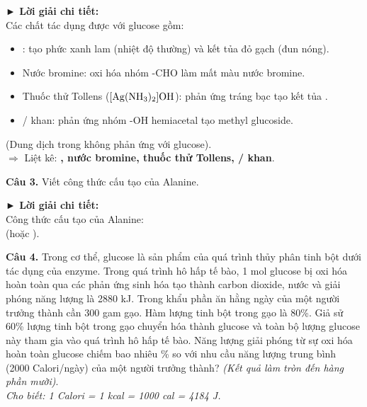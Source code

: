 \documentclass[11pt,a4paper]{article}
\begin{document}
\begin{tcolorbox}[colback=white,colframe=solBlue,arc=1mm,boxrule=0.5pt,top=2mm,bottom=2mm,left=3mm,right=3mm]
{\color{solBlue}\textbf{► Lời giải chi tiết:}}\\
Các chất tác dụng được với glucose gồm:
\begin{itemize}[noitemsep,topsep=1pt]
\item {}: tạo phức xanh lam (nhiệt độ thường) và kết tủa đỏ gạch  (đun nóng).
\item Nước bromine: oxi hóa nhóm -CHO làm mất màu nước bromine.
\item Thuốc thử Tollens ($[\ce{Ag(NH3)2}]\ce{OH}$): phản ứng tráng bạc tạo kết tủa .
\item {}/ khan: phản ứng nhóm -OH hemiacetal tạo methyl glucoside.
\end{itemize}
(Dung dịch  trong  không phản ứng với glucose).\\
$\Rightarrow$ Liệt kê: \textbf{, nước bromine, thuốc thử Tollens, / khan}.
\end{tcolorbox}

\vspace{6pt}
\noindent\textbf{Câu 3.} Viết công thức cấu tạo của Alanine.

\begin{tcolorbox}[colback=white,colframe=solBlue,arc=1mm,boxrule=0.5pt,top=2mm,bottom=2mm,left=3mm,right=3mm]
{\color{solBlue}\textbf{► Lời giải chi tiết:}}\\
Công thức cấu tạo của Alanine:\\
\textbf{} (hoặc ).
\end{tcolorbox}

\vspace{6pt}
\noindent\textbf{Câu 4.} Trong cơ thể, glucose là sản phẩm của quá trình thủy phân tinh bột dưới tác dụng của enzyme. Trong quá trình hô hấp tế bào, 1 mol glucose bị oxi hóa hoàn toàn qua các phản ứng sinh hóa tạo thành carbon dioxide, nước và giải phóng năng lượng là 2880 kJ. Trong khẩu phần ăn hằng ngày của một người trưởng thành cần 300 gam gạo. Hàm lượng tinh bột trong gạo là 80\%. Giả sử 60\% lượng tinh bột trong gạo chuyển hóa thành glucose và toàn bộ lượng glucose này tham gia vào quá trình hô hấp tế bào. Năng lượng giải phóng từ sự oxi hóa hoàn toàn glucose chiếm bao nhiêu \% so với nhu cầu năng lượng trung bình (2000 Calori/ngày) của một người trưởng thành? \textit{(Kết quả làm tròn đến hàng phần mười)}.\\
\textit{Cho biết: 1 Calori = 1 kcal = 1000 cal = 4184 J.}
\end{document}

